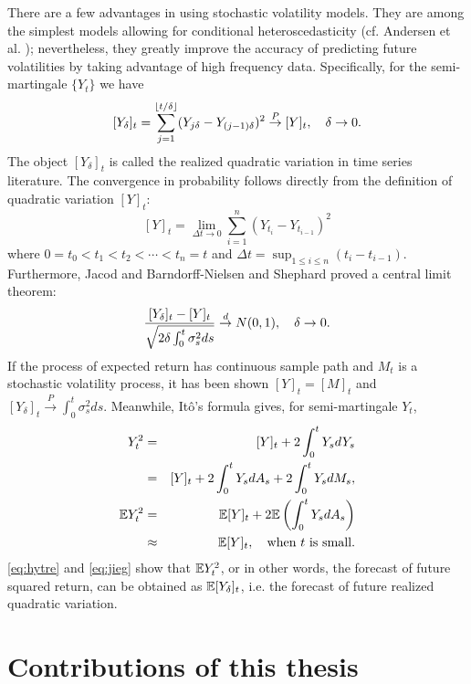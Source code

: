 There are a few advantages in using stochastic volatility models.
They are among the simplest models allowing for conditional
heteroscedasticity (cf. Andersen et al.
\cite{andersen:davis:kreiss:mikosch:2009}); nevertheless,
they greatly improve the accuracy of predicting future volatilities
by taking advantage of high frequency data. Specifically, for the
semi-martingale $\{Y_t\}$ we have
\begin{equation}
  \label{eq:jieg}
  [Y_{\delta}]_t
  =
  \sum_{j=1}^{\lfloor t/\delta\rfloor}
  (Y_{j \delta} - Y_{(j-1)\delta})^2
  \overset{P}{\to} [Y]_t,
  \quad
  \delta \to 0.
\end{equation}
The object $[Y_\delta]_t$ is called the realized quadratic variation
in time series literature.
The convergence in probability follows directly from the definition of
quadratic variation $[Y]_t$:
\[
[Y]_t = \lim_{\Delta t \to 0} \sum_{i=1}^{n} (Y_{t_i} - Y_{t_{i-1}})^2
\]
where $0 = t_0 < t_1 < t_2 < \cdots < t_n = t$ and
$\Delta t = \sup_{1\leq i \leq n} (t_i - t_{i-1})$.
Furthermore, Jacod \cite{jacod:1994} and
Barndorff-Nielsen and Shephard \cite{barndorff:shephard:2002} proved a
central limit theorem:
\[
  {[Y_\delta]_t - [Y]_t \over \sqrt{2 \delta \int_0^t \sigma_s^2 ds}}
  \overset{d}{\to} N(0, 1),
  \quad \delta \to 0.
\]
If the process of expected return has continuous sample path and $M_t$
is a stochastic volatility process, it has been shown $[Y]_t = [M]_t$ and
$[Y_\delta]_t \overset{P}{\to} \int_0^t \sigma_s^2 ds$. Meanwhile,
It\^o's formula gives, for semi-martingale $Y_t$,
\begin{eqnarray}
  Y_t^2 &=& [Y]_t + 2 \int_0^t Y_s d Y_s \nonumber \\
  &=& [Y]_t + 2 \int_0^t Y_s dA_s + 2 \int_0^t Y_s dM_s, \nonumber \\
  \mathbb{E} Y_t^2 &=& \mathbb{E} [Y]_t + 2 \mathbb{E} \left( \int_0^t Y_s dA_s \right) \nonumber\\
  &\approx& \mathbb{E} [Y]_t, \quad \text{when $t$ is small}. \label{eq:hytre}
\end{eqnarray}
\eqref{eq:hytre} and \eqref{eq:jieg} show that $\mathbb{E} Y_t^2$, or in other
words, the forecast of future squared return, can be obtained as
$\mathbb{E} [Y_\delta]_t$, i.e. the forecast of future realized quadratic
variation.


\section{Contributions of this thesis}\label{sec:contr}

